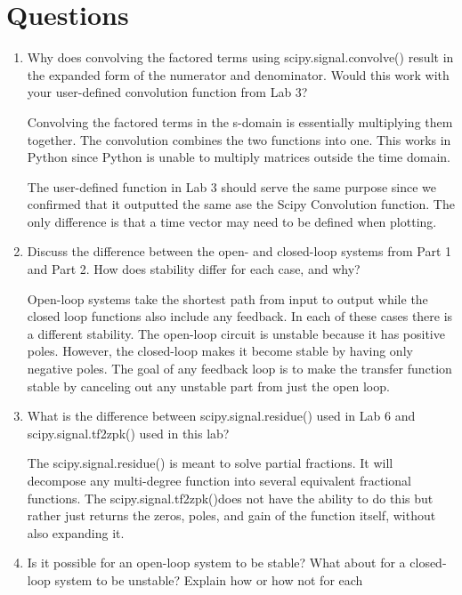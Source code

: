 \documentclass[12pt, titlepage]{article}
\begin{document}
    \section{Questions}
    \begin{enumerate}
        \item Why does convolving the factored terms using scipy.signal.convolve() result in the expanded form of the numerator and denominator.  Would this work with your user-defined convolution function from Lab 3?
        
        Convolving the factored terms in the s-domain is essentially multiplying them together.  The convolution combines the two functions into one.  This works in Python since Python is unable to multiply matrices outside the time domain.
        
        The user-defined function in Lab 3 should serve the same purpose since we confirmed that it outputted the same ase the Scipy Convolution function.  The only difference is that a time vector may need to be defined when plotting.
        
        \item Discuss the difference between the open- and closed-loop systems from Part 1 and Part 2. How does stability differ for each case, and why?
        
        Open-loop systems take the shortest path from input to output while the closed loop functions also include any feedback.  In each of these cases there is a different stability.  The open-loop circuit is unstable because it has positive poles.  However, the closed-loop makes it become stable by having only negative poles.  The goal of any feedback loop is to make the transfer function stable by canceling out any unstable part from just the open loop.
        
        \item What is the difference between scipy.signal.residue() used in Lab 6 and scipy.signal.tf2zpk() used in this lab?
        
        The scipy.signal.residue() is meant to solve partial fractions.  It will decompose any multi-degree function into several equivalent fractional functions.  The scipy.signal.tf2zpk()does not have the ability to do this but rather just returns the zeros, poles, and gain of the function itself, without also expanding it.
        
        \item Is it possible for an open-loop system to be stable? What about for a closed-loop system to be unstable? Explain how or how not for each
        

\end{enumerate}
\end{document}
